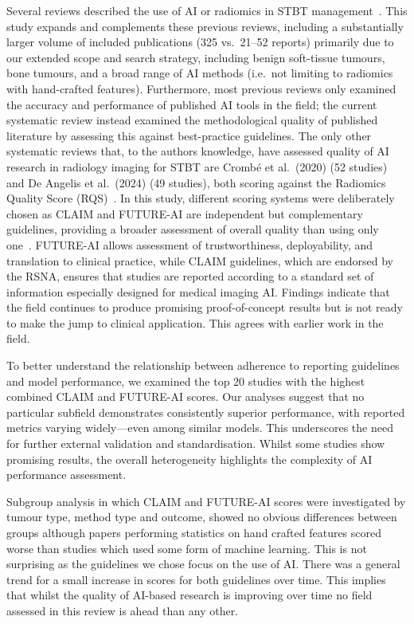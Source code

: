 Several reviews described the use of AI or radiomics in STBT management~\autocite{crombe2020,deangelis2024,crombe2023,zhu2024}.
This study expands and complements these previous reviews, including a substantially larger volume of included publications (325 vs.\ 21--52 reports) primarily due to our extended scope and search strategy, including benign soft-tissue tumours, bone tumours, and a broad range of AI methods (i.e.\ not limiting to radiomics with hand-crafted features).
Furthermore, most previous reviews only examined the accuracy and performance of published AI tools in the field; the current systematic review instead examined the methodological quality of published literature by assessing this against best-practice guidelines.
The only other systematic reviews that, to the authors knowledge, have assessed quality of AI research in radiology imaging for STBT are Crombé et al.\ (2020) (52 studies) and De Angelis et al.\ (2024) (49 studies), both scoring against the Radiomics Quality Score (RQS)~\autocite{crombe2020,deangelis2024}.
In this study, different scoring systems were deliberately chosen as CLAIM and FUTURE-AI are independent but complementary guidelines, providing a broader assessment of overall quality than using only one~\autocite{klontzas2023}.
FUTURE-AI allows assessment of trustworthiness, deployability, and translation to clinical practice, while CLAIM guidelines, which are endorsed by the RSNA, ensures that studies are reported according to a standard set of information especially designed for medical imaging AI.
Findings indicate that the field continues to produce promising proof-of-concept results but is not ready to make the jump to clinical application.
This agrees with earlier work in the field.

To better understand the relationship between adherence to reporting guidelines and model performance, we examined the top 20 studies with the highest combined CLAIM and FUTURE-AI scores.
Our analyses suggest that no particular subfield demonstrates consistently superior performance, with reported metrics varying widely---even among similar models.
This underscores the need for further external validation and standardisation.
Whilst some studies show promising results, the overall heterogeneity highlights the complexity of AI performance assessment.

Subgroup analysis in which CLAIM and FUTURE-AI scores were investigated by tumour type, method type and outcome, showed no obvious differences between groups although papers performing statistics on hand crafted features scored worse than studies which used some form of machine learning.
This is not surprising as the guidelines we chose focus on the use of AI.
There was a general trend for a small increase in scores for both guidelines over time.
This implies that whilst the quality of AI-based research is improving over time no field assessed in this review is ahead than any other.

